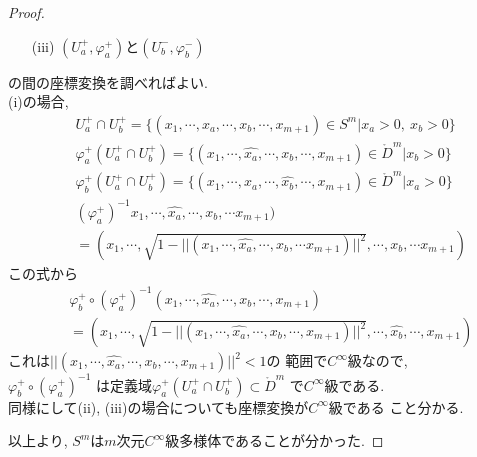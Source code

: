 \documentclass[a4j,12pt]{jarticle}
\theoremstyle{definition}
\begin{document}
\begin{proof}
\begin{itemize}
\begin{itemize}
            \item[(iii)] $(U_a^+,\varphi_a^+)$と$(U_b^-,\varphi_b^-)$ 
        \end{itemize}
        の間の座標変換を調べればよい. \\
        (i)の場合, 
        \begin{eqnarray*}
            &&U_a^+\cap U_b^+ =\{(x_1,\cdots ,x_a,\cdots ,x_b,\cdots ,x_{m+1})\in S^m|x_a>0,\ x_b>0\}\\
            &&\varphi_a^+(U_a^+\cap U_b^+) =\{(x_1,\cdots ,\hat{x_a},\cdots ,x_b,\cdots ,x_{m+1})\in \mathring{D}^m|x_b>0\}\\
            &&\varphi_b^+(U_a^+\cap U_b^+) =\{(x_1,\cdots ,x_a,\cdots ,\hat{x_b},\cdots ,x_{m+1})\in \mathring{D}^m|x_a>0\}\\
            &&(\varphi_a^+)^{-1}x_1,\cdots ,\hat{x_a},\cdots ,x_b,\cdots x_{m+1})\\
            &&=(x_1,\cdots ,\sqrt{1-||(x_1,\cdots ,\hat{x_a},\cdots ,x_b,\cdots x_{m+1})||^2},\cdots ,x_b,\cdots x_{m+1})
        \end{eqnarray*}
        この式から
        \begin{eqnarray*}
        &&\varphi_b^+\circ(\varphi_a^+)^{-1}(x_1,\cdots ,\hat{x_a},\cdots ,x_b,\cdots ,x_{m+1})\\
        &&=(x_1,\cdots ,\sqrt{1-||(x_1,\cdots ,\hat{x_a},\cdots ,x_b,\cdots ,x_{m+1})||^2},\cdots ,\hat{x_b},\cdots ,x_{m+1})
        \end{eqnarray*}
        これは$||(x_1,\cdots ,\hat{x_a},\cdots ,x_b,\cdots ,x_{m+1})||^2<1$の
        範囲で$C^{\infty}$級なので, \\$\varphi_b^+\circ(\varphi_a^+)^{-1}$
        は定義域$\varphi_a^+(U_a^+\cap U_b^+)\subset \mathring{D}^m$
        で$C^{\infty}$級である. \\
        同様にして(ii), (iii)の場合についても座標変換が$C^{\infty}$級である
        こと分かる. \\
    \end{itemize}
    以上より, $S^m$は$m$次元$C^{\infty}$級多様体であることが分かった. 
\end{proof}
\end{document}

